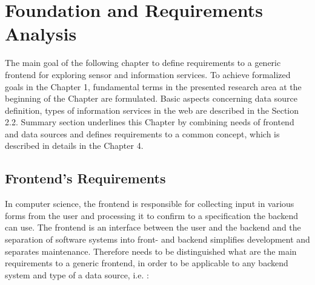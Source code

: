 \chapter{Foundation and Requirements Analysis}
	The main goal of the following chapter to define requirements to a generic frontend for exploring sensor and information services. To achieve formalized goals in the Chapter 1, fundamental terms in the presented research area at the beginning of the Chapter are formulated. Basic aspects concerning data source definition, types of information services in the web are described in the Section 2.2. Summary section underlines this Chapter by combining needs of frontend and data sources and defines requirements to a common concept, which is described in details in the Chapter 4.

\section {Frontend's Requirements}
	In computer science, the frontend is responsible for collecting input in various forms from the user and processing it to confirm to a specification the backend can use. The frontend is an interface between the user and the backend\cite{wiki:xxx} and the separation of software systems into front- and backend simplifies development and separates maintenance. Therefore needs to be distinguished what are the main requirements to a generic frontend, in order to be applicable to any backend system and type of a data source, i.e. :


